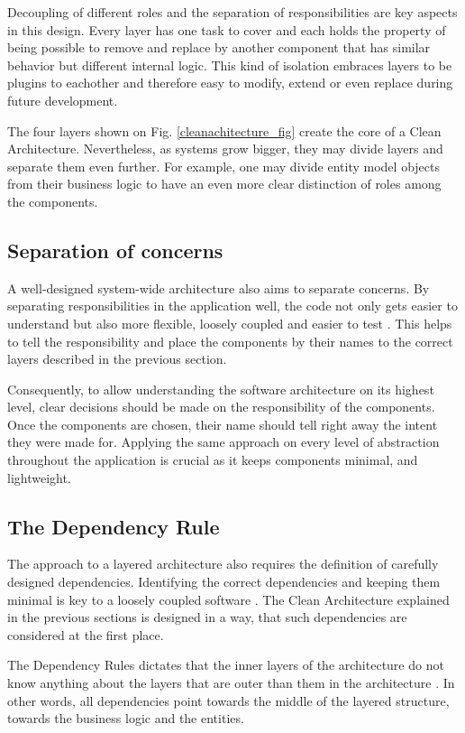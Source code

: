 \documentclass[conference]{IEEEtran}
\begin{document}
Decoupling of different roles and the separation of responsibilities are key aspects in this design. Every layer has one task to cover and each holds the property of being possible to remove and replace by another component that has similar behavior but different internal logic. This kind of isolation embraces layers to be plugins to eachother and therefore easy to modify, extend or even replace during future development.

The four layers shown on Fig. \ref{cleanachitecture_fig} create the core of a Clean Architecture. Nevertheless, as systems grow bigger, they may divide layers and separate them even further. For example, one may divide entity model objects from their business logic to have an even more clear distinction of roles among the components.

\subsection{Separation of concerns}
A well-designed system-wide architecture also aims to separate concerns. By separating responsibilities in the application well, the code not only gets easier to understand but also more flexible, loosely coupled and easier to test  \cite{cleancoder} \cite{cleanarchitecture} \cite{onionarchitecture}. This helps to tell the responsibility and place the components by their names to the correct layers described in the previous section.

Consequently, to allow understanding the software architecture on its highest level, clear decisions should be made on the responsibility of the components. Once the components are chosen, their name should tell right away the intent they were made for. Applying the same approach on every level of abstraction throughout the application is crucial as it keeps components minimal, and lightweight. 

\subsection{The Dependency Rule}
The approach to a layered architecture also requires the definition of carefully designed dependencies. Identifying the correct dependencies and keeping them minimal is key to a loosely coupled software \cite{cleancode}. The Clean Architecture explained in the previous sections is designed in a way, that such dependencies are considered at the first place.

The Dependency Rules dictates that the inner layers of the architecture do not know anything about the layers that are outer than them in the architecture \cite{cleanarchitecture} \cite{onionarchitecture}. In other words, all dependencies point towards the middle of the layered structure, towards the business logic and the entities. 
\end{document}

